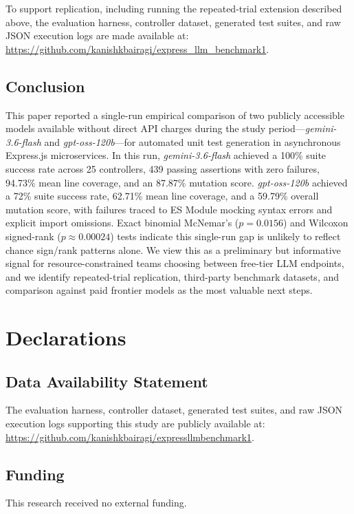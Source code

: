 \documentclass[conference]{IEEEtran}
\begin{document}
To support replication, including running the repeated-trial extension described above, the evaluation harness, controller dataset, generated test suites, and raw JSON execution logs are made available at: \url{https://github.com/kanishkbairagi/express_llm_benchmark1}.

\subsection{Conclusion}

This paper reported a single-run empirical comparison of two publicly accessible models available without direct API charges during the study period---\textit{gemini-3.6-flash} and \textit{gpt-oss-120b}---for automated unit test generation in asynchronous Express.js microservices. In this run, \textit{gemini-3.6-flash} achieved a 100\% suite success rate across 25 controllers, 439 passing assertions with zero failures, 94.73\% mean line coverage, and an 87.87\% mutation score. \textit{gpt-oss-120b} achieved a 72\% suite success rate, 62.71\% mean line coverage, and a 59.79\% overall mutation score, with failures traced to ES Module mocking syntax errors and explicit import omissions. Exact binomial McNemar's ($p = 0.0156$) and Wilcoxon signed-rank ($p \approx 0.00024$) tests indicate this single-run gap is unlikely to reflect chance sign/rank patterns alone. We view this as a preliminary but informative signal for resource-constrained teams choosing between free-tier LLM endpoints, and we identify repeated-trial replication, third-party benchmark datasets, and comparison against paid frontier models as the most valuable next steps.

\section*{Declarations}

\subsection*{Data Availability Statement}
The evaluation harness, controller dataset, generated test suites, and raw JSON execution logs supporting this study are publicly available at: \url{https://github.com/kanishkbairagi/expressllmbenchmark1}.

\subsection*{Funding}
This research received no external funding.
\end{document}
